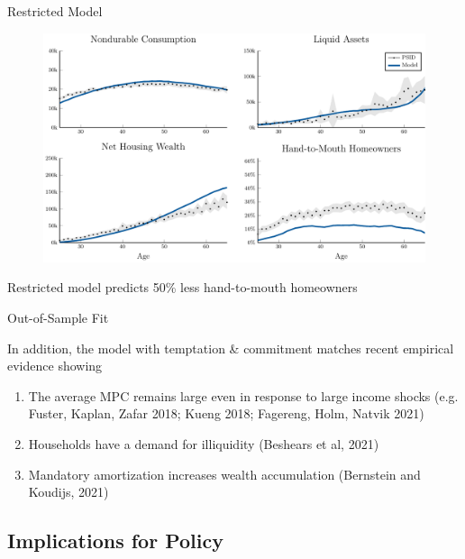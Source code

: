 \documentclass[10pt,english,t,10pt]{beamer}
\begin{document}
\begin{frame} {Restricted Model}

\begin{figure}[ht]
\centering
\includegraphics[scale=0.45]{Prezentation_Graphs/TargetedMoments_Standard}
\end{figure}

Restricted model predicts 50\% less hand-to-mouth homeowners

\end{frame}


\begin{frame}{Out-of-Sample Fit}


In addition, the model with temptation \& commitment matches recent empirical evidence showing 
\medskip \medskip 
\begin{enumerate}
	\item The average MPC remains large even in response to large income shocks 
	{\color{gray}\quad (e.g. Fuster, Kaplan, Zafar 2018; Kueng 2018; Fagereng, Holm, Natvik 2021)}
	

	\item Households have a demand for illiquidity {\color{gray}(Beshears et al, 2021)}

	\item Mandatory amortization increases wealth accumulation {\color{gray}(Bernstein and Koudijs, 2021)}
\end{enumerate}

\end{frame}


\subsection{Implications for Policy}
\end{document}
